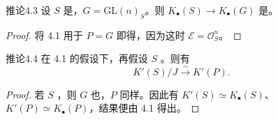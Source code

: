 \begin{SGAresult}{推论}{4.3}
设 $S$ 是，$G=\mathrm{GL}(n)_S$。则 $K_\bullet(S)\to K_\bullet(G)$ 是。
\end{SGAresult}
\begin{proof}
将 4.1 用于 $P=G$ 即得，因为这时 $\mathcal E=\mathcal O_S^n$。
\end{proof}

\begin{SGAresult}{推论}{4.4}
在 4.1 的假设下，再假设 $S$ 。则有
\[
K'(S)/J\xrightarrow{\sim}K'(P).
\]
\end{SGAresult}
\begin{proof}
若 $S$ ，则 $G$ 也，$P$ 同样。因此有 $K'(S)\simeq K_\bullet(S)$、$K'(P)\simeq K_\bullet(P)$，结果便由 4.1 得出。
\end{proof}
